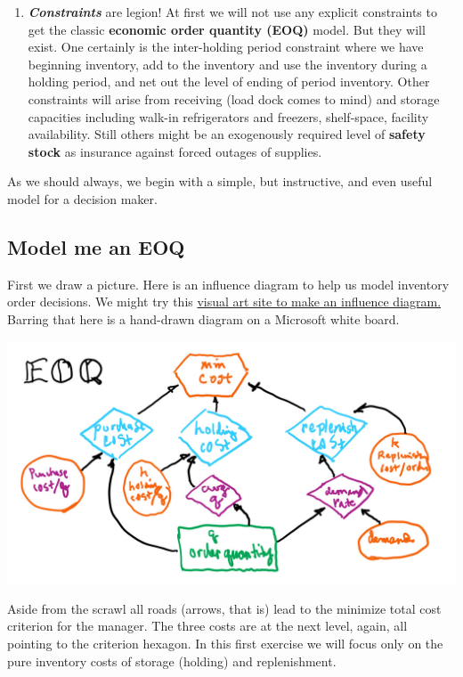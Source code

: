 \documentclass[
]{book}
\providecommand{\tightlist}{%
  \setlength{\itemsep}{0pt}\setlength{\parskip}{0pt}}
\begin{document}
\begin{enumerate}
\def\labelenumi{\arabic{enumi}.}
\setcounter{enumi}{2}
\tightlist
\item
  \emph{\textbf{Constraints}} are legion! At first we will not use any explicit constraints to get the classic \textbf{economic order quantity (EOQ)} model. But they will exist. One certainly is the inter-holding period constraint where we have beginning inventory, add to the inventory and use the inventory during a holding period, and net out the level of ending of period inventory. Other constraints will arise from receiving (load dock comes to mind) and storage capacities including walk-in refrigerators and freezers, shelf-space, facility availability. Still others might be an exogenously required level of \textbf{safety stock} as insurance against forced outages of supplies.
\end{enumerate}

As we should always, we begin with a simple, but instructive, and even useful model for a decision maker.

\hypertarget{model-me-an-eoq}{%
\subsection{Model me an EOQ}\label{model-me-an-eoq}}

First we draw a picture. Here is an influence diagram to help us model inventory order decisions. We might try this \href{https://online.visual-paradigm.com/drive/\#diagramlist:proj=0\&new=InfluenceDiagram}{visual art site to make an influence diagram.} Barring that here is a hand-drawn diagram on a Microsoft white board.

\includegraphics{images/04/eoq-diagram.jpg}

Aside from the scrawl all roads (arrows, that is) lead to the minimize total cost criterion for the manager. The three costs are at the next level, again, all pointing to the criterion hexagon. In this first exercise we will focus only on the pure inventory costs of storage (holding) and replenishment.
\end{document}
